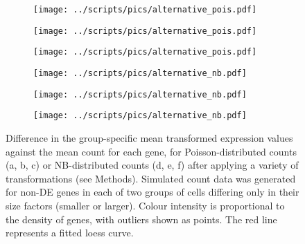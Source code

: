\documentclass[10pt,letterpaper]{article}
\begin{document}
\begin{figure}
\centering
\begin{subfigure}[b]{0.32\textwidth}
    \texttt{[image: ../scripts/pics/alternative\_pois.pdf]}
    \caption{}
\end{subfigure}
\begin{subfigure}[b]{0.32\textwidth}
    \texttt{[image: ../scripts/pics/alternative\_pois.pdf]}
    \caption{}
\end{subfigure}
\begin{subfigure}[b]{0.32\textwidth}
    \texttt{[image: ../scripts/pics/alternative\_pois.pdf]}
    \caption{}
\end{subfigure}
\begin{subfigure}[b]{0.32\textwidth}
    \texttt{[image: ../scripts/pics/alternative\_nb.pdf]}
    \caption{}
\end{subfigure}
\begin{subfigure}[b]{0.32\textwidth}
   \texttt{[image: ../scripts/pics/alternative\_nb.pdf]}
    \caption{}
\end{subfigure}
\begin{subfigure}[b]{0.32\textwidth}
   \texttt{[image: ../scripts/pics/alternative\_nb.pdf]}
    \caption{}
\end{subfigure}
\caption{Difference in the group-specific mean transformed expression values against the mean count for each gene, 
for Poisson-distributed counts (a, b, c) or NB-distributed counts (d, e, f) after applying a variety of transformations (see Methods).
Simulated count data was generated for non-DE genes in each of two groups of cells differing only in their size factors (smaller or larger).
Colour intensity is proportional to the density of genes, with outliers shown as points.
The red line represents a fitted loess curve.
}
\label{fig:alttransform}
\end{figure}
\end{document}
